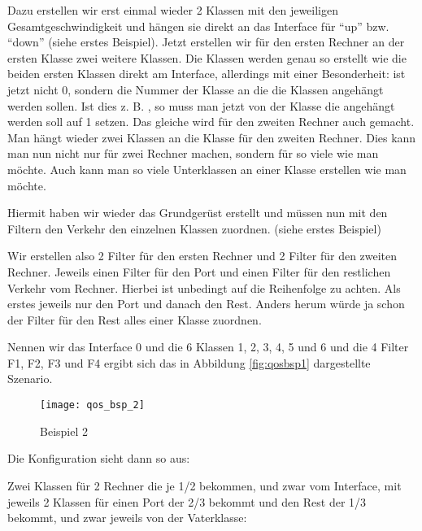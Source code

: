   Dazu erstellen wir erst einmal wieder 2 Klassen mit den jeweiligen
   Gesamtgeschwindigkeit und hängen sie direkt an das Interface für
   ``up'' bzw. ``down'' (siehe erstes Beispiel). Jetzt erstellen wir für
   den ersten Rechner an der ersten Klasse zwei weitere Klassen. Die
   Klassen werden genau so erstellt wie die beiden ersten Klassen direkt
   am Interface, allerdings mit einer Besonderheit:
    ist jetzt nicht 0, sondern die Nummer der
   Klasse an die die Klassen angehängt werden sollen. Ist dies z. B.
   , so muss man jetzt  von der Klasse
   die angehängt werden soll auf 1 setzen. Das gleiche wird für den
   zweiten Rechner auch gemacht. Man hängt wieder zwei Klassen an die
   Klasse für den zweiten Rechner. Dies kann man nun nicht nur für zwei
   Rechner machen, sondern für so viele wie man möchte. Auch kann man
   so viele Unterklassen an einer Klasse erstellen wie man möchte.

   Hiermit haben wir wieder das Grundgerüst erstellt und müssen nun mit
   den Filtern den Verkehr den einzelnen Klassen zuordnen. (siehe
   erstes Beispiel)

   Wir erstellen also 2 Filter für den ersten Rechner und 2 Filter für
   den zweiten Rechner. Jeweils einen Filter für den Port und einen
   Filter für den restlichen Verkehr vom Rechner. Hierbei ist unbedingt
   auf die Reihenfolge zu achten. Als erstes jeweils nur den Port und
   danach den Rest. Anders herum würde ja schon der Filter für den Rest
   alles einer Klasse zuordnen.

   Nennen wir das Interface 0 und die 6 Klassen 1, 2, 3, 4, 5 und 6
   und die 4 Filter F1, F2, F3 und F4 ergibt sich das in Abbildung
   \ref{fig:qosbsp1} dargestellte Szenario.

   \begin{figure}[htbp]
     \centering
     \texttt{[image: qos\_bsp\_2]}%
     \caption{Beispiel 2}
   \end{figure}

   Die Konfiguration sieht dann so aus:

   Zwei Klassen für 2 Rechner die je 1/2 bekommen, und zwar vom
   Interface, mit jeweils 2 Klassen für einen Port der 2/3 bekommt und
   den Rest der 1/3 bekommt, und zwar jeweils von der Vaterklasse:

